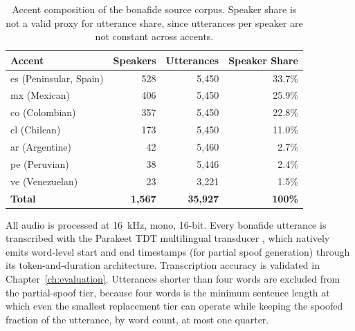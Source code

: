 \documentclass[11pt]{report}
\begin{document}
\begin{table}[H]
\centering
\caption{Accent composition of the bonafide source corpus. Speaker share
is not a valid proxy for utterance share, since utterances per speaker
are not constant across accents.}
\label{tab:accents}
\small
\begin{tabular}{lrrr}
\toprule
\textbf{Accent} & \textbf{Speakers} & \textbf{Utterances} & \textbf{Speaker Share} \\
\midrule
es (Peninsular, Spain) & 528 & 5{,}450 & 33.7\% \\
mx (Mexican)           & 406 & 5{,}450 & 25.9\% \\
co (Colombian)         & 357 & 5{,}450 & 22.8\% \\
cl (Chilean)           & 173 & 5{,}450 & 11.0\% \\
ar (Argentine)         & 42  & 5{,}460 & 2.7\% \\
pe (Peruvian)          & 38  & 5{,}446 & 2.4\% \\
ve (Venezuelan)        & 23  & 3{,}221 & 1.5\% \\
\midrule
\textbf{Total}         & \textbf{1{,}567} & \textbf{35{,}927} & \textbf{100\%} \\
\bottomrule
\end{tabular}
\end{table}

All audio is processed at \SI{16}{\kilo\hertz}, mono, 16-bit. Every
bonafide utterance is transcribed with the Parakeet TDT multilingual
transducer \citep{tdt,parakeet}, which natively emits word-level start
and end timestamps (for partial spoof generation) through its
token-and-duration architecture. Transcription accuracy is validated in
Chapter~\ref{ch:evaluation}. Utterances shorter than four words are
excluded from the partial-spoof tier, because four words is the minimum
sentence length at which even the smallest replacement tier can operate
while keeping the spoofed fraction of the utterance, by word count, at
most one quarter.
\end{document}
